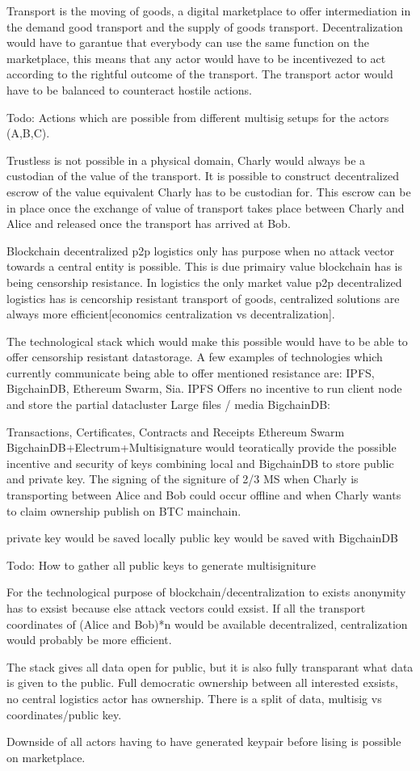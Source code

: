 \documentclass[Nomencl]{DylanMaster}
\begin{document}
Transport is the moving of goods, a digital marketplace to offer intermediation in the demand good transport and the supply of goods transport. Decentralization would have to garantue that everybody can use the same function on the marketplace, this means that any actor would have to be incentivezed to act according to the rightful outcome of the transport. The transport actor would have to be balanced to counteract hostile actions.

Todo: Actions which are possible from different multisig setups for the actors (A,B,C).

Trustless is not possible in a physical domain, Charly would always be a custodian of the value of the transport. It is possible to construct decentralized escrow of the value equivalent Charly has to be custodian for. This escrow can be in place once the exchange of value of transport takes place between Charly and Alice and released once the transport has arrived at Bob.

Blockchain decentralized p2p logistics only has purpose when no attack vector towards a central entity is possible. This is due primairy value blockchain has is being censorship resistance. In logistics the only market value p2p decentralized logistics has is cencorship resistant transport of goods, centralized solutions are always more efficient[economics centralization vs decentralization].

The technological stack which would make this possible would have to be able to offer censorship resistant datastorage. A few examples of technologies which currently communicate being able to offer mentioned resistance are: IPFS, BigchainDB, Ethereum Swarm, Sia.
IPFS
Offers no incentive to run client node and store the partial datacluster
Large files / media
BigchainDB:

Transactions, Certificates, Contracts and Receipts
Ethereum Swarm
BigchainDB+Electrum+Multisignature would teoratically provide the possible incentive and security of keys combining local and BigchainDB to store public and private key. The signing of the signiture of 2/3 MS when Charly is transporting between Alice and Bob could occur offline and when Charly wants to claim ownership publish on BTC mainchain.

private key would be saved locally
public key would be saved with BigchainDB

Todo: How to gather all public keys to generate multisigniture

For the technological purpose of blockchain/decentralization to exists anonymity has to exsist because else attack vectors could exsist. If all the transport coordinates of (Alice and Bob)*n would be available decentralized, centralization would probably be more efficient.

The stack gives all data open for public, but it is also fully transparant what data is given to the public. Full democratic ownership between all interested exsists, no central logistics actor has ownership. There is a split of data, multisig vs coordinates/public key.

Downside of all actors having to have generated keypair before lising is possible on marketplace.



\end{document}
